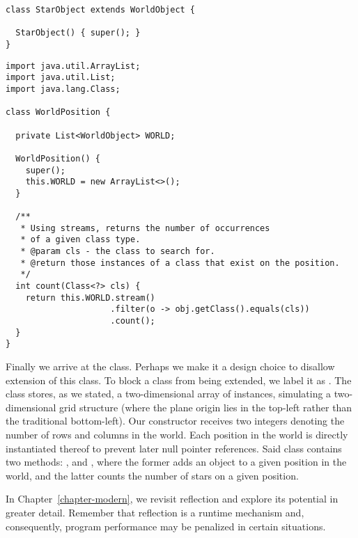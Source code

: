 \enlargethispage{3\baselineskip}
\begin{lstlisting}[language=MyJava]
class StarObject extends WorldObject {
  
  StarObject() { super(); }
}
\end{lstlisting}


\begin{lstlisting}[language=MyJava]
import java.util.ArrayList;
import java.util.List;
import java.lang.Class;

class WorldPosition {

  private List<WorldObject> WORLD;

  WorldPosition() { 
    super(); 
    this.WORLD = new ArrayList<>();  
  }

  /**
   * Using streams, returns the number of occurrences 
   * of a given class type.
   * @param cls - the class to search for.
   * @return those instances of a class that exist on the position.
   */
  int count(Class<?> cls) {
    return this.WORLD.stream()
                     .filter(o -> obj.getClass().equals(cls))
                     .count();
  }
}
\end{lstlisting}

Finally we arrive at the  class. Perhaps we make it a design choice to disallow extension of this class. To block a class from being extended, we label it as . The  class stores, as we stated, a two-dimensional array of  instances, simulating a two-dimensional grid structure (where the plane origin lies in the top-left rather than the traditional bottom-left). Our constructor receives two integers denoting the number of rows and columns in the world. Each position in the world is directly instantiated thereof to prevent later null pointer references. Said  class contains two methods: , and , where the former adds an object to a given position in the world, and the latter counts the number of stars on a given position.

In Chapter~\ref{chapter-modern}, we revisit reflection and explore its potential in greater detail. Remember that reflection is a runtime mechanism and, consequently, program performance may be penalized in certain situations.

